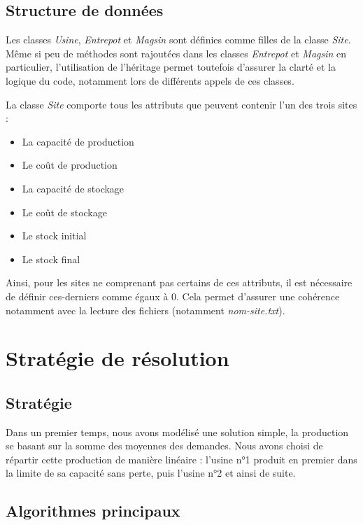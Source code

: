 \documentclass[12pt, a4paper]{article}
\begin{document}
\subsection{Structure de données}

Les classes \emph{Usine}, \emph{Entrepot} et \emph{Magsin} sont définies comme filles de la classe \emph{Site}. Même si peu de méthodes sont rajoutées dans les classes \emph{Entrepot} et \emph{Magsin} en particulier, l'utilisation de l'héritage permet toutefois d'assurer la clarté et la logique du code, notamment lors de différents appels de ces classes.

La classe \emph{Site} comporte tous les attributs que peuvent contenir l'un des trois sites :
\begin{itemize}
\item La capacité de production
\item Le coût de production
\item La capacité de stockage
\item Le coût de stockage
\item Le stock initial
\item Le stock final
\end{itemize}
Ainsi, pour les sites ne comprenant pas certains de ces attributs, il est nécessaire de définir ces-derniers comme égaux à 0. Cela permet d'assurer une cohérence notamment avec la lecture des fichiers (notamment \emph{nom-site.txt}).


\section{Stratégie de résolution}

\subsection{Stratégie}
Dans un premier temps, nous avons modélisé une solution simple, la production se basant sur la somme des moyennes des demandes. Nous avons choisi de répartir cette production de manière linéaire : l'usine n°1 produit en premier dans la limite de sa capacité sans perte, puis l'usine n°2 et ainsi de suite.
\subsection{Algorithmes principaux}
\end{document}
